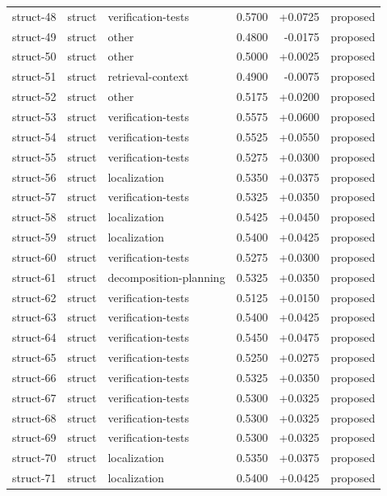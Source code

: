 \begin{center}
\begin{longtable}{llp{5.2cm}rrl}
struct-48 & struct & verification-tests & 0.5700 & +0.0725 & proposed \\
struct-49 & struct & other & 0.4800 & -0.0175 & proposed \\
struct-50 & struct & other & 0.5000 & +0.0025 & proposed \\
struct-51 & struct & retrieval-context & 0.4900 & -0.0075 & proposed \\
struct-52 & struct & other & 0.5175 & +0.0200 & proposed \\
struct-53 & struct & verification-tests & 0.5575 & +0.0600 & proposed \\
struct-54 & struct & verification-tests & 0.5525 & +0.0550 & proposed \\
struct-55 & struct & verification-tests & 0.5275 & +0.0300 & proposed \\
struct-56 & struct & localization & 0.5350 & +0.0375 & proposed \\
struct-57 & struct & verification-tests & 0.5325 & +0.0350 & proposed \\
struct-58 & struct & localization & 0.5425 & +0.0450 & proposed \\
struct-59 & struct & localization & 0.5400 & +0.0425 & proposed \\
struct-60 & struct & verification-tests & 0.5275 & +0.0300 & proposed \\
struct-61 & struct & decomposition-planning & 0.5325 & +0.0350 & proposed \\
struct-62 & struct & verification-tests & 0.5125 & +0.0150 & proposed \\
struct-63 & struct & verification-tests & 0.5400 & +0.0425 & proposed \\
struct-64 & struct & verification-tests & 0.5450 & +0.0475 & proposed \\
struct-65 & struct & verification-tests & 0.5250 & +0.0275 & proposed \\
struct-66 & struct & verification-tests & 0.5325 & +0.0350 & proposed \\
struct-67 & struct & verification-tests & 0.5300 & +0.0325 & proposed \\
struct-68 & struct & verification-tests & 0.5300 & +0.0325 & proposed \\
struct-69 & struct & verification-tests & 0.5300 & +0.0325 & proposed \\
struct-70 & struct & localization & 0.5350 & +0.0375 & proposed \\
struct-71 & struct & localization & 0.5400 & +0.0425 & proposed \\

\end{longtable}
\end{center}
